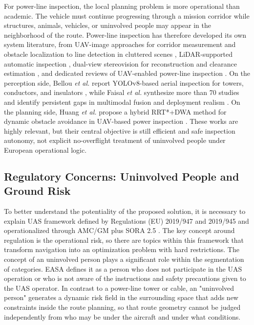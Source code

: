 \documentclass[a4paper,11pt]{article}
\begin{document}
For power-line inspection, the local planning problem is more operational than academic. The vehicle must continue progressing through a mission corridor while structures, animals, vehicles, or uninvolved people may appear in the neighborhood of the route. Power-line inspection has therefore developed its own system literature, from UAV-image approaches for corridor measurement and obstacle localization \cite{zhang2017powerline} to line detection in cluttered scenes \cite{zhang2019powerlines}, LiDAR-supported automatic inspection \cite{guan2021uavlidar}, dual-view stereovision for reconstruction and clearance estimation \cite{zhou2022dualview}, and dedicated reviews of UAV-enabled power-line inspection \cite{mendu2025state}. On the perception side, Bellou \emph{et al.} report YOLOv8-based aerial inspection for towers, conductors, and insulators \cite{bellou2024aerial}, while Faisal \emph{et al.} synthesize more than 70 studies and identify persistent gaps in multimodal fusion and deployment realism \cite{faisal2025deep}. On the planning side, Huang \emph{et al.} propose a hybrid RRT*+DWA method for dynamic obstacle avoidance in UAV-based power inspection \cite{huang2025hybrid}. These works are highly relevant, but their central objective is still efficient and safe inspection autonomy, not explicit no-overflight treatment of uninvolved people under European operational logic.

\subsection{Regulatory Concerns: Uninvolved People and Ground Risk}

To better understand the potentiality of the proposed solution, it is necessary to explain UAS framework defined by Regulations (EU) 2019/947 and 2019/945 and operationalized through AMC/GM plus SORA 2.5 \cite{EU2019_947,EU2019_945,JARUS_SORA_2_5_2024,EASA_AMC_GM_SORA25_2025}. The key concept around regulation is the operational risk, so there are topics within this framework that transform navigation into an optimization problem with hard restrictions. The concept of an uninvolved person plays a significant role within the segmentation of categories. EASA defines it as a person who does not participate in the UAS operation or who is not aware of the instructions and safety precautions given to the UAS operator. In contrast to a power-line tower or cable, an "uninvolved person" generates a dynamic risk field in the surrounding space that adds new constraints inside the route planning, so that route geometry cannot be judged independently from who may be under the aircraft and under what conditions. 
\end{document}
